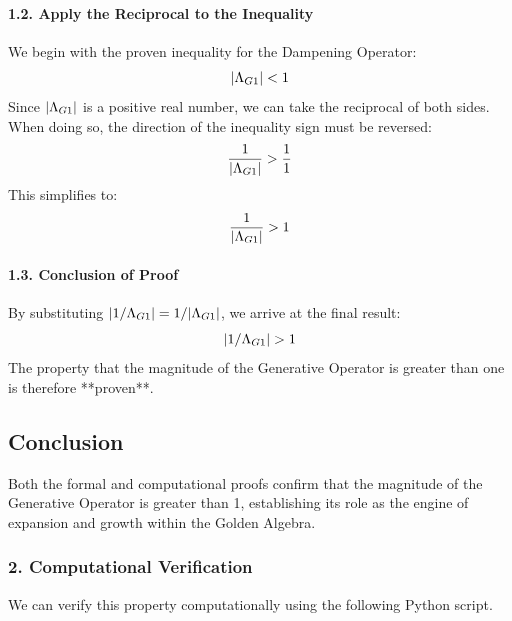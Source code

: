 \paragraph{1.2. Apply the Reciprocal to the Inequality}
We begin with the proven inequality for the Dampening Operator:
$$ |\Lambda_{G1}| < 1 $$
Since $|\Lambda_{G1}|$ is a positive real number, we can take the reciprocal of both sides. When doing so, the direction of the inequality sign must be reversed:
$$ \frac{1}{|\Lambda_{G1}|} > \frac{1}{1} $$
This simplifies to:
$$ \frac{1}{|\Lambda_{G1}|} > 1 $$

\paragraph{1.3. Conclusion of Proof}
By substituting $|1/\Lambda_{G1}| = 1/|\Lambda_{G1}|$, we arrive at the final result:
$$ |1/\Lambda_{G1}| > 1 $$
The property that the magnitude of the Generative Operator is greater than one is therefore **proven**.

\subsection*{Conclusion}
Both the formal and computational proofs confirm that the magnitude of the Generative Operator is greater than 1, establishing its role as the engine of expansion and growth within the Golden Algebra.


\subsubsection*{2. Computational Verification}
We can verify this property computationally using the following Python script.

